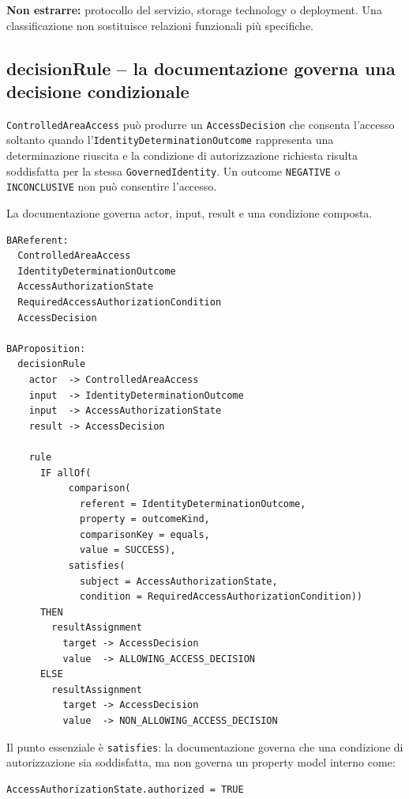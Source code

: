\documentclass[11pt,a4paper]{article}
\newcommand{\code}[1]{\nolinkurl{#1}}
\begin{document}
\textbf{Non estrarre:} protocollo del servizio, storage technology o deployment. Una classificazione non sostituisce relazioni funzionali più specifiche.

\subsection{decisionRule -- la documentazione governa una decisione condizionale}

\begin{examplebox}
\code{ControlledAreaAccess} può produrre un \code{AccessDecision} che consenta l'accesso soltanto quando l'\code{IdentityDeterminationOutcome} rappresenta una determinazione riuscita e la condizione di autorizzazione richiesta risulta soddisfatta per la stessa \code{GovernedIdentity}. Un outcome \code{NEGATIVE} o \code{INCONCLUSIVE} non può consentire l'accesso.
\end{examplebox}

La documentazione governa actor, input, result e una condizione composta.

\begin{lstlisting}
BAReferent:
  ControlledAreaAccess
  IdentityDeterminationOutcome
  AccessAuthorizationState
  RequiredAccessAuthorizationCondition
  AccessDecision

BAProposition:
  decisionRule
    actor  -> ControlledAreaAccess
    input  -> IdentityDeterminationOutcome
    input  -> AccessAuthorizationState
    result -> AccessDecision

    rule
      IF allOf(
           comparison(
             referent = IdentityDeterminationOutcome,
             property = outcomeKind,
             comparisonKey = equals,
             value = SUCCESS),
           satisfies(
             subject = AccessAuthorizationState,
             condition = RequiredAccessAuthorizationCondition))
      THEN
        resultAssignment
          target -> AccessDecision
          value  -> ALLOWING_ACCESS_DECISION
      ELSE
        resultAssignment
          target -> AccessDecision
          value  -> NON_ALLOWING_ACCESS_DECISION
\end{lstlisting}

Il punto essenziale è \code{satisfies}: la documentazione governa che una condizione di autorizzazione sia soddisfatta, ma non governa un property model interno come:

\begin{lstlisting}
AccessAuthorizationState.authorized = TRUE
\end{lstlisting}
\end{document}
